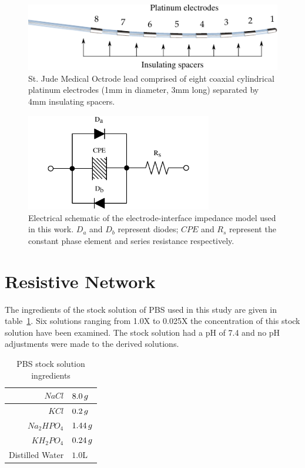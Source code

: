 \documentclass[journal, a4paper]{IEEEtran}
\begin{document}
\begin{figure}
    \begin{center}
    \includegraphics{graphics/StJudeOctrodeDiagram}
    \end{center}
    \caption{St. Jude Medical Octrode lead comprised of eight coaxial cylindrical platinum electrodes (1mm in diameter, 3mm long) separated by 4mm insulating spacers.}
    \label{fig:octrode}
\end{figure}

\begin{figure}
    \begin{center}
        \includegraphics[width=230pt]{graphics/interfaceSchematic_noMemristive}
    \end{center}
    \caption{Electrical schematic of the electrode-interface impedance model used in this work. $D_{a}$ and $D_{b}$ represent diodes; $CPE$ and $R_{s}$ represent the constant phase element and series resistance respectively.}
    \label{fig:schematic}
\end{figure}

\section{Resistive Network}
The ingredients of the stock solution of PBS used in this study are given in table~\ref{tab:PBSrecipe}.
Six solutions ranging from 1.0X to 0.025X the concentration of this stock solution have been examined.
The stock solution had a pH of 7.4 and no pH adjustments were made to the derived solutions.

\begin{table}
    \begin{center}
        \begin{tabular}{|r|l|}
            \hline
            $NaCl$ & $8.0\thinspace g$ \\ \hline
            $KCl$ & $0.2\thinspace g$ \\ \hline
            $Na_{2}HPO_{4}$ & $1.44\thinspace g$ \\ \hline
            $KH_{2}PO_{4}$ & $0.24\thinspace g$ \\ \hline
            Distilled Water & $1.0$\thinspace L \\ \hline
        \end{tabular}
    \end{center}
    \caption{PBS stock solution ingredients}
    \label{tab:PBSrecipe}
\end{table}
\end{document}
